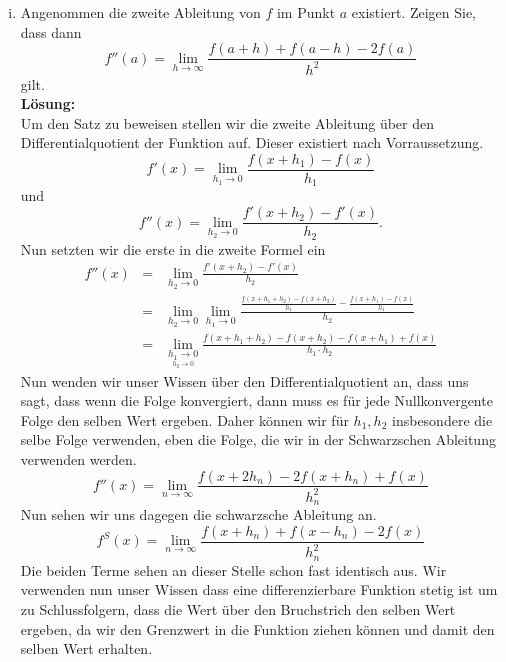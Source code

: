 \documentclass[11pt,a4paper,ngerman]{article}
\begin{document}
\begin{enumerate}[(i)]
    \item Angenommen die zweite Ableitung von $f$ im Punkt $a$ existiert. Zeigen Sie, dass dann
        $$
            f''(a) = \underset{h \rightarrow \infty}{\lim} \frac{f(a+h) + f(a-h) - 2 f(a)}{h^2}
        $$
        gilt.\\
    \textbf{Lösung:}\\
        Um den Satz zu beweisen stellen wir die zweite Ableitung über den Differentialquotient
        der Funktion auf. Dieser existiert nach Vorraussetzung.
        $$
            f'(x) = \underset{h_1 \rightarrow 0}{\lim} \frac{f(x + h_1) - f(x)}{h_1}
        $$
        und
        $$
            f''(x) = \underset{h_2 \rightarrow 0}{\lim} \frac{f'(x + h_2) - f'(x)}{h_2}.
        $$
        Nun setzten wir die erste in die zweite Formel ein
        $$\begin{array}{rcl}
            f''(x) &=& \underset{h_2 \rightarrow 0}{\lim} \frac{f'(x + h_2) - f'(x)}{h_2}\\
                &=& \underset{h_2 \rightarrow 0}{\lim} \underset{h_1 \rightarrow 0}{\lim} 
                \frac{\frac{f(x + h_1 + h_2) - f(x + h_2)}{h_1} - \frac{f(x+h_1) - f(x)}{h_1}}{h_2}\\
                &=& \underset{\underset{h_2 \rightarrow 0}{h_1 \rightarrow 0}}{\lim}
                \frac{f(x + h_1 + h_2) - f(x + h_2) - f(x+h_1) + f(x)}{h_1 \cdot h_2}
        \end{array}$$
        Nun wenden wir unser Wissen über den Differentialquotient an, dass uns sagt, dass wenn die
        Folge konvergiert, dann muss es für jede Nullkonvergente Folge den selben Wert ergeben.
        Daher können wir für $h_1,h_2$ insbesondere die selbe Folge verwenden, eben die Folge,
        die wir in der Schwarzschen Ableitung verwenden werden.
        $$
            f''(x) = \underset{n \rightarrow \infty}{\lim} \frac{f(x + 2h_n) - 2f(x+h_n) + f(x)}{h_n^2}
        $$
        Nun sehen wir uns dagegen die schwarzsche Ableitung an.
        $$
            f^S(x) = \underset{n \rightarrow \infty}{\lim} \frac{f(x+h_n) + f(x-h_n) - 2f(x)}{h_n^2}
        $$
        Die beiden Terme sehen an dieser Stelle schon fast identisch aus. Wir verwenden nun unser Wissen
        dass eine differenzierbare Funktion stetig ist um zu Schlussfolgern, dass die Wert über den
        Bruchstrich den selben Wert ergeben, da wir den Grenzwert in die Funktion ziehen können und
        damit den selben Wert erhalten.
        


\end{enumerate}
\end{document}
